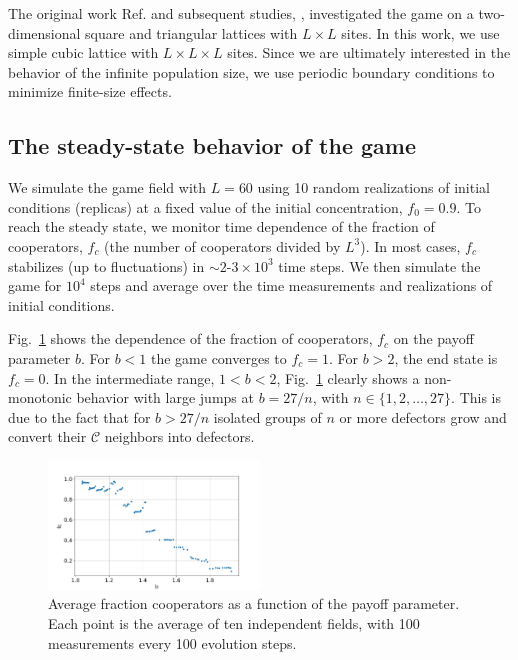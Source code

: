 \documentclass[a4paper]{jpconf}
\begin{document}
The original work Ref. \cite{Nowak1992, Nowak1993} and subsequent studies, \cite{Kolotev2018, Burovski2019},
investigated the game on a two-dimensional square and triangular lattices with $L\times L$ sites.
In this work, we use simple cubic lattice with $L\times L \times L$ sites.
Since we are ultimately interested in the behavior of the infinite population size, 
we use periodic boundary conditions to minimize finite-size effects.

\subsection{The steady-state behavior of the game}
\label{subsec:fc}

We simulate the game field with $L=60$ using 10 random realizations of initial conditions (replicas) at a fixed value of the initial concentration, $f_0 = 0.9$.
To reach the steady state, we monitor time dependence of the fraction of cooperators, $f_c$ (the number of cooperators divided by $L^3$). 
In most cases, $f_c$ stabilizes (up to fluctuations) in $\sim 2$-$3 \times 10^3$ time steps.  
We then simulate the game for $10^4$ steps and average over the time measurements and realizations of initial conditions.

Fig.\ \ref{fig:Fc} shows the dependence of the fraction of cooperators, $f_c$ on the payoff parameter $b$. 
For $b < 1$ the game converges to $f_c = 1$. For $b > 2$, the end state is $f_c = 0$. In the intermediate range, $1 < b < 2$, Fig.\ \ref{fig:Fc} clearly shows a non-monotonic behavior with large jumps at 
$b = 27 / n$, with $n\in\{1, 2, \ldots, 27\} $. This is due to the fact that for $b > 27/n$ isolated groups of $n$ or more defectors grow and convert their $\mathcal{C}$ neighbors into defectors.

\begin{figure}[H]
	\centering
	
	\includegraphics[width=0.5\textwidth]{C_0.9_graph.png}
	\caption{Average fraction cooperators as a function of the payoff parameter. Each point is the average of ten independent fields, with 100 measurements every 100 evolution steps.}
	\label{fig:Fc}
\end{figure}
\end{document}
